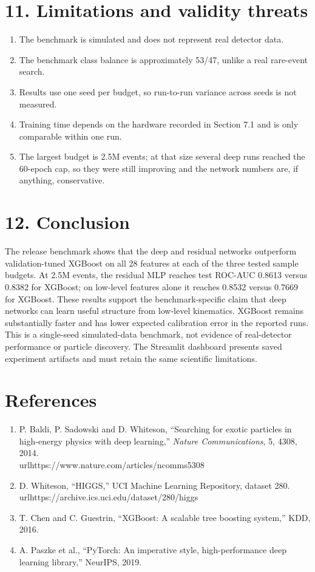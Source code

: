 \documentclass[11pt,a4paper,oneside]{report}
\begin{document}
\section{11. Limitations and validity threats}

\begin{enumerate}
\item The benchmark is simulated and does not represent real detector data.
\item The benchmark class balance is approximately 53/47, unlike a real rare-event search.
\item Results use one seed per budget, so run-to-run variance across seeds is not measured.
\item Training time depends on the hardware recorded in Section 7.1 and is only comparable within one run.
\item The largest budget is 2.5M events; at that size several deep runs reached the 60-epoch cap, so they were still improving and the network numbers are, if anything, conservative.
\end{enumerate}

\section{12. Conclusion}

The release benchmark shows that the deep and residual networks outperform validation-tuned XGBoost on all 28 features at each of the three tested sample budgets. At 2.5M events, the residual MLP reaches test ROC-AUC 0.8613 versus 0.8382 for XGBoost; on low-level features alone it reaches 0.8532 versus 0.7669 for XGBoost. These results support the benchmark-specific claim that deep networks can learn useful structure from low-level kinematics. XGBoost remains substantially faster and has lower expected calibration error in the reported runs. This is a single-seed simulated-data benchmark, not evidence of real-detector performance or particle discovery. The Streamlit dashboard presents saved experiment artifacts and must retain the same scientific limitations. 

\section{References}

\begin{enumerate}
\item P. Baldi, P. Sadowski and D. Whiteson, “Searching for exotic particles in high-energy physics with deep learning,” \emph{Nature Communications}, 5, 4308, 2014. \\url{https://www.nature.com/articles/ncomms5308}
\item D. Whiteson, “HIGGS,” UCI Machine Learning Repository, dataset 280. \\url{https://archive.ics.uci.edu/dataset/280/higgs}
\item T. Chen and C. Guestrin, “XGBoost: A scalable tree boosting system,” KDD, 2016.
\item A. Paszke et al., “PyTorch: An imperative style, high-performance deep learning library,” NeurIPS, 2019.
\end{enumerate}
\end{document}

